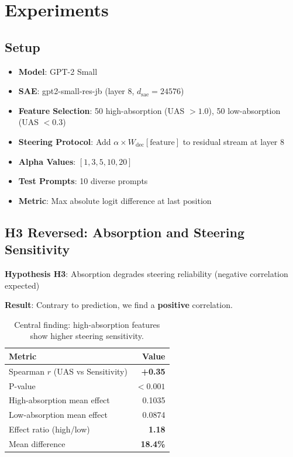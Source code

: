 \documentclass{article}
\begin{document}
\section{Experiments}

\subsection{Setup}

\begin{itemize}
    \item \textbf{Model}: GPT-2 Small
    \item \textbf{SAE}: gpt2-small-res-jb (layer 8, $d_{\text{sae}}=24576$)
    \item \textbf{Feature Selection}: 50 high-absorption (UAS $> 1.0$), 50 low-absorption (UAS $< 0.3$)
    \item \textbf{Steering Protocol}: Add $\alpha \times W_{\text{dec}}[\text{feature}]$ to residual stream at layer 8
    \item \textbf{Alpha Values}: $[1, 3, 5, 10, 20]$
    \item \textbf{Test Prompts}: 10 diverse prompts
    \item \textbf{Metric}: Max absolute logit difference at last position
\end{itemize}

\subsection{H3 Reversed: Absorption and Steering Sensitivity}

\textbf{Hypothesis H3}: Absorption degrades steering reliability (negative correlation expected)

\textbf{Result}: Contrary to prediction, we find a \textbf{positive} correlation.

\begin{table}[t]
\caption{Central finding: high-absorption features show higher steering sensitivity.}
\label{tab:h3-results}
\centering
\begin{tabular}{lr}
\toprule
Metric & Value \\
\midrule
Spearman $r$ (UAS vs Sensitivity) & \textbf{+0.35} \\
P-value & \textbf{$< 0.001$} \\
High-absorption mean effect & 0.1035 \\
Low-absorption mean effect & 0.0874 \\
Effect ratio (high/low) & \textbf{1.18} \\
Mean difference & \textbf{18.4\%} \\
\bottomrule
\end{tabular}
\end{table}
\end{document}
